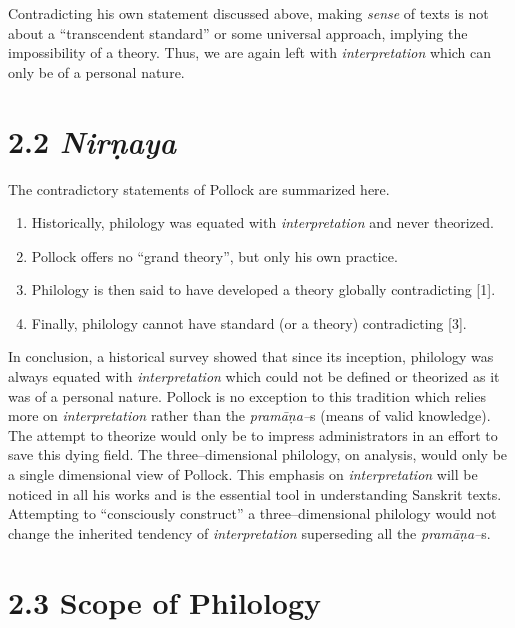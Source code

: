 Contradicting his own statement discussed above, making \textit{sense} of texts is not about a “transcendent standard” or some universal approach, implying the impossibility of a theory. Thus, we are again left with \textit{interpretation} which can only be of a personal nature.


\section*{2.2 {\it {\bfseries Nirṇaya}}}

The contradictory statements of Pollock are summarized here.

\begin{enumerate}
\itemsep=0pt
\item Historically, philology was equated with \textit{interpretation} and never theorized.

 \item Pollock offers no “grand theory”, but only his own practice.

 \item Philology is then said to have developed a theory globally contradicting [1].

 \item Finally, philology cannot have standard (or a theory) contradicting [3].

\end{enumerate}

In conclusion, a historical survey showed that since its inception, philology was always equated with \textit{interpretation} which could not be defined or theorized as it was of a personal nature. Pollock is no exception to this tradition which relies more on \textit{interpretation} rather than the \textit{pramāṇa–}s (means of valid knowledge). The attempt to theorize would only be to impress administrators in an effort to save this dying field. The three–dimensional philology, on analysis, would only be a single dimensional view of Pollock. This emphasis on \textit{interpretation} will be noticed in all his works and is the essential tool in understanding Sanskrit texts. Attempting to “consciously construct” a three–dimensional philology would not change the inherited tendency of \textit{interpretation} superseding all the \textit{pramāṇa–}s.


\section*{2.3 Scope of Philology}

